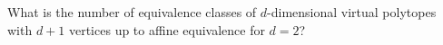 What is the number of equivalence classes of $d$-dimensional virtual polytopes with $d + 1$ vertices up to affine equivalence for $d = 2$?
